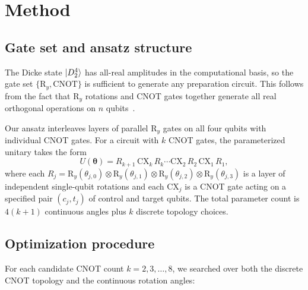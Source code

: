 \documentclass[twocolumn,10pt]{article}
\newcommand{\Ry}{\mathrm{R}_y}
\newcommand{\CNOT}{\mathrm{CNOT}}
\newcommand{\CX}{\mathrm{CX}}
\begin{document}
\section{Method}
\label{sec:method}

\subsection{Gate set and ansatz structure}

The Dicke state $\ket{D_2^4}$ has all-real amplitudes in the computational
basis, so the gate set $\{\Ry, \CNOT\}$ is sufficient to generate any
preparation circuit. This follows from the fact that $\Ry$ rotations and CNOT
gates together generate all real orthogonal operations on $n$
qubits~\cite{wang2024}.

Our ansatz interleaves layers of parallel $\Ry$ gates on all four qubits with
individual CNOT gates. For a circuit with $k$ CNOT gates, the parameterized
unitary takes the form
\begin{equation}\label{eq:ansatz}
    U(\boldsymbol{\theta}) = R_{k+1}\, \CX_k\, R_k \cdots \CX_2\, R_2\, \CX_1\, R_1,
\end{equation}
where each $R_j = \Ry(\theta_{j,0}) \otimes \Ry(\theta_{j,1}) \otimes
\Ry(\theta_{j,2}) \otimes \Ry(\theta_{j,3})$ is a layer of independent
single-qubit rotations and each $\CX_j$ is a CNOT gate acting on a specified
pair $(c_j, t_j)$ of control and target qubits. The total parameter count is
$4(k+1)$ continuous angles plus $k$ discrete topology choices.

\subsection{Optimization procedure}

For each candidate CNOT count $k = 2, 3, \ldots, 8$, we searched over both the
discrete CNOT topology and the continuous rotation angles:
\end{document}
